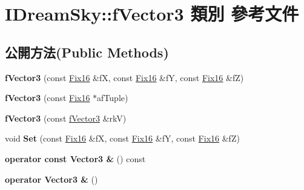 \hypertarget{class_i_dream_sky_1_1f_vector3}{}\section{I\+Dream\+Sky\+:\+:f\+Vector3 類別 參考文件}
\label{class_i_dream_sky_1_1f_vector3}
\subsection*{公開方法(Public Methods)}
\begin{DoxyCompactItemize}
\item 
{\bfseries f\+Vector3} (const \hyperlink{class_i_dream_sky_1_1_fix_point}{Fix16} \&fX, const \hyperlink{class_i_dream_sky_1_1_fix_point}{Fix16} \&fY, const \hyperlink{class_i_dream_sky_1_1_fix_point}{Fix16} \&fZ)\hypertarget{class_i_dream_sky_1_1f_vector3_a5da3a6fbd843b1ae09cf30e9f7ea099e}{}\label{class_i_dream_sky_1_1f_vector3_a5da3a6fbd843b1ae09cf30e9f7ea099e}

\item 
{\bfseries f\+Vector3} (const \hyperlink{class_i_dream_sky_1_1_fix_point}{Fix16} $\ast$af\+Tuple)\hypertarget{class_i_dream_sky_1_1f_vector3_a1cf5495be4bdf3142450fe2fc68285d8}{}\label{class_i_dream_sky_1_1f_vector3_a1cf5495be4bdf3142450fe2fc68285d8}

\item 
{\bfseries f\+Vector3} (const \hyperlink{class_i_dream_sky_1_1f_vector3}{f\+Vector3} \&rkV)\hypertarget{class_i_dream_sky_1_1f_vector3_a083b75705851d7a7624bf11d901e807a}{}\label{class_i_dream_sky_1_1f_vector3_a083b75705851d7a7624bf11d901e807a}

\item 
void {\bfseries Set} (const \hyperlink{class_i_dream_sky_1_1_fix_point}{Fix16} \&fX, const \hyperlink{class_i_dream_sky_1_1_fix_point}{Fix16} \&fY, const \hyperlink{class_i_dream_sky_1_1_fix_point}{Fix16} \&fZ)\hypertarget{class_i_dream_sky_1_1f_vector3_a578a4d6a3bd29185381794f368e7cb66}{}\label{class_i_dream_sky_1_1f_vector3_a578a4d6a3bd29185381794f368e7cb66}

\item 
{\bfseries operator const Vector3 \&} () const \hypertarget{class_i_dream_sky_1_1f_vector3_a2a77cad3091c77c49cbe90e3459ba857}{}\label{class_i_dream_sky_1_1f_vector3_a2a77cad3091c77c49cbe90e3459ba857}

\item 
{\bfseries operator Vector3 \&} ()\hypertarget{class_i_dream_sky_1_1f_vector3_aac5f5545d947942bfcf918c8efcc4fc4}{}\label{class_i_dream_sky_1_1f_vector3_aac5f5545d947942bfcf918c8efcc4fc4}


\end{DoxyCompactItemize}
